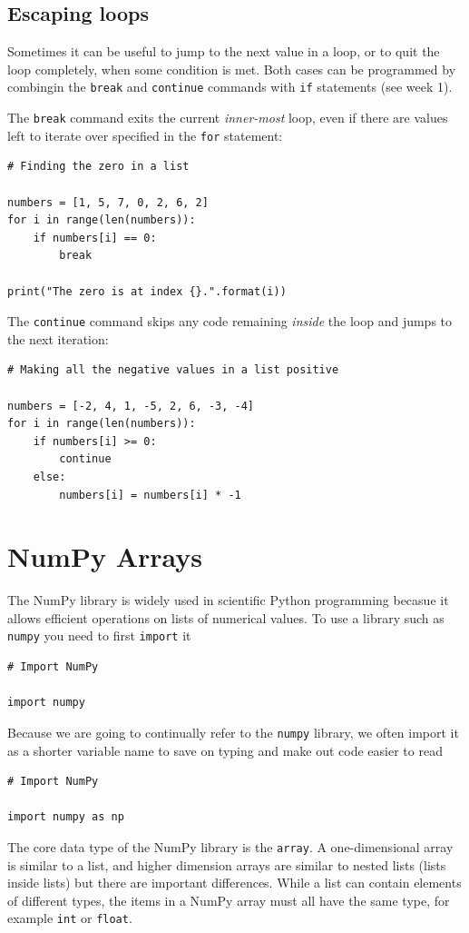 \documentclass[a4paper]{article}
\begin{document}
\subsection{Escaping loops}
Sometimes it can be useful to jump to the next value in a loop, or to quit the loop completely, when some condition is met. Both cases can be programmed by combingin the \texttt{break} and \texttt{continue} commands with \texttt{if} statements (see week 1).

The \texttt{break} command exits the current \emph{inner-most} loop, even if there are values left to iterate over specified in the \texttt{for} statement: 
\begin{lstlisting}
# Finding the zero in a list

numbers = [1, 5, 7, 0, 2, 6, 2]
for i in range(len(numbers)):
	if numbers[i] == 0:
		break

print("The zero is at index {}.".format(i))
\end{lstlisting}

The \texttt{continue} command skips any code remaining \emph{inside} the loop and jumps to the next iteration:
\begin{lstlisting}
# Making all the negative values in a list positive

numbers = [-2, 4, 1, -5, 2, 6, -3, -4]
for i in range(len(numbers)):
	if numbers[i] >= 0:
		continue
	else:
		numbers[i] = numbers[i] * -1
\end{lstlisting}

\section{NumPy Arrays}

The NumPy library is widely used in scientific Python programming becasue it allows efficient operations on lists of numerical values.\cite{numpy}
To use a library such as \texttt{numpy} you need to first \texttt{import} it
\begin{lstlisting}
# Import NumPy

import numpy
\end{lstlisting}
Because we are going to continually refer to the \texttt{numpy} library, we often import it as a shorter variable name to save on typing and make out code easier to read
\begin{lstlisting}
# Import NumPy

import numpy as np
\end{lstlisting}

The core data type of the NumPy library is the \texttt{array}. A  one-dimensional array is similar to a list, and higher dimension arrays are similar to nested lists (lists inside lists) but there are important differences.
While a list can contain elements of different types, the items in a NumPy array must all have the same type, for example \texttt{int} or \texttt{float}.
\end{document}
